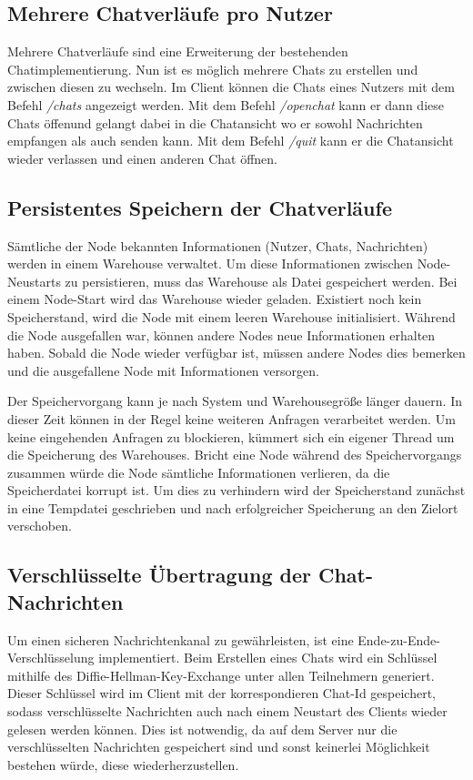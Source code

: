 \author{Matthias Vonend, Troy Keßler}
\subsection{Mehrere Chatverläufe pro Nutzer}
Mehrere Chatverläufe sind eine Erweiterung der bestehenden Chatimplementierung. Nun ist es möglich mehrere Chats zu erstellen und zwischen diesen zu wechseln.
Im Client können die Chats eines Nutzers mit dem Befehl \textit{/chats} angezeigt werden. 
Mit dem Befehl \textit{/openchat} kann er dann diese Chats öffenund gelangt dabei in die Chatansicht wo er sowohl Nachrichten empfangen als auch senden kann.
Mit dem Befehl \textit{/quit} kann er die Chatansicht wieder verlassen und einen anderen Chat öffnen.

\author{Matthias Vonend}
\subsection{Persistentes Speichern der Chatverläufe}\label{persistance}
Sämtliche der Node bekannten Informationen (Nutzer, Chats, Nachrichten) werden in einem Warehouse verwaltet. 
Um diese Informationen zwischen Node-Neustarts zu persistieren, muss das Warehouse als Datei gespeichert werden. 
Bei einem Node-Start wird das Warehouse wieder geladen. Existiert noch kein Speicherstand, wird die Node mit einem leeren Warehouse initialisiert.
Während die Node ausgefallen war, können andere Nodes neue Informationen erhalten haben. 
Sobald die Node wieder verfügbar ist, müssen andere Nodes dies bemerken und die ausgefallene Node mit Informationen versorgen. 

Der Speichervorgang kann je nach System und Warehousegröße länger dauern. 
In dieser Zeit können in der Regel keine weiteren Anfragen verarbeitet werden. 
Um keine eingehenden Anfragen zu blockieren, kümmert sich ein eigener Thread um die Speicherung des Warehouses.
Bricht eine Node während des Speichervorgangs zusammen würde die Node sämtliche Informationen verlieren, da die Speicherdatei korrupt ist.
Um dies zu verhindern wird der Speicherstand zunächst in eine Tempdatei geschrieben und nach erfolgreicher Speicherung an den Zielort verschoben.

\author{Troy Keßler, Michael Angermeier}
\subsection{Verschlüsselte Übertragung der Chat-Nachrichten}\label{encryption}
Um einen sicheren Nachrichtenkanal zu gewährleisten, ist eine Ende-zu-Ende-Verschlüsselung implementiert. 
Beim Erstellen eines Chats wird ein Schlüssel mithilfe des Diffie-Hellman-Key-Exchange unter allen Teilnehmern generiert.
Dieser Schlüssel wird im Client mit der korrespondieren Chat-Id gespeichert, sodass verschlüsselte Nachrichten
auch nach einem Neustart des Clients wieder gelesen werden können. Dies ist notwendig, da auf dem Server nur die verschlüsselten
Nachrichten gespeichert sind und sonst keinerlei Möglichkeit bestehen würde, diese wiederherzustellen. 

